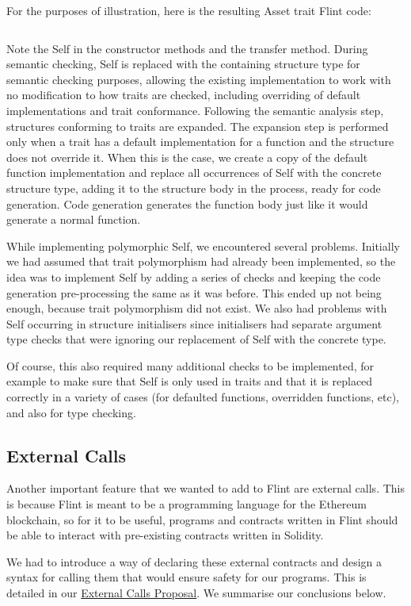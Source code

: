 For the purposes of illustration, here is the resulting Asset trait Flint code:

\inputminted{swift}{code/asset.flint}

Note the Self in the constructor methods and the transfer method. During semantic checking, Self is replaced with the containing structure type for semantic checking purposes, allowing the existing implementation to work with no modification to how traits are checked, including overriding of default implementations and trait conformance. Following the semantic analysis step, structures conforming to traits are expanded. The expansion step is performed only when a trait has a default implementation for a function and the structure does not override it. When this is the case, we create a copy of the default function implementation and replace all occurrences of Self with the concrete structure type, adding it to the structure body in the process, ready for code generation. Code generation generates the function body just like it would generate a normal function.

While implementing polymorphic Self, we encountered several problems. Initially we had assumed that trait polymorphism had already been implemented, so the idea was to implement Self by adding a series of checks and keeping the code generation pre-processing the same as it was before. This ended up not being enough, because trait polymorphism did not exist. We also had problems with Self occurring in structure initialisers since initialisers had separate argument type checks that were ignoring our replacement of Self with the concrete type.

Of course, this also required many additional checks to be implemented, for example to make sure that Self is only used in traits and that it is replaced correctly in a variety of cases (for defaulted functions, overridden functions, etc), and also for type checking.

\subsection{External Calls}

Another important feature that we wanted to add to Flint are external calls. This is because Flint is meant to be a programming language for the Ethereum blockchain, so for it to be useful, programs and contracts written in Flint should be able to interact with pre-existing contracts written in Solidity.

We had to introduce a way of declaring these external contracts and design a syntax for calling them that would ensure safety for our programs. This is detailed in our \hyperref[chp:appendix-a]{External Calls Proposal}. We summarise our conclusions below.

